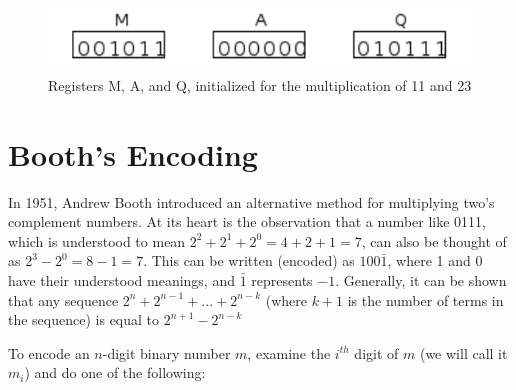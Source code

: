 \documentclass{article}
\begin{document}
\begin{figure}[h]
\centering
\includegraphics{init.pdf}
\caption{Registers M, A, and Q, initialized for the multiplication of 11 and 23}
\end{figure}

\section{Booth's Encoding}
In 1951, Andrew Booth introduced an alternative method for multiplying two's complement numbers.
At its heart is the observation that a number like 0111, which is understood to mean $2^2 + 2^1 + 2^0 = 4 + 2 + 1 = 7$, can also be thought of as $2^3 - 2^0 = 8 - 1 = 7$.
This can be written (encoded) as $100\bar{1}$, where 1 and 0 have their understood meanings, and $\bar{1}$ represents $-1$.
Generally, it can be shown that any sequence $2^n + 2^{n-1} + ...
+ 2^{n-k}$ (where $k+1$ is the number of terms in the sequence) is equal to $2^{n+1} - 2^{n-k}$

To encode an $n$-digit binary number $m$, examine the $i^{th}$ digit of $m$ (we will call it $m_i$) and do one of the following: %
\end{document}
